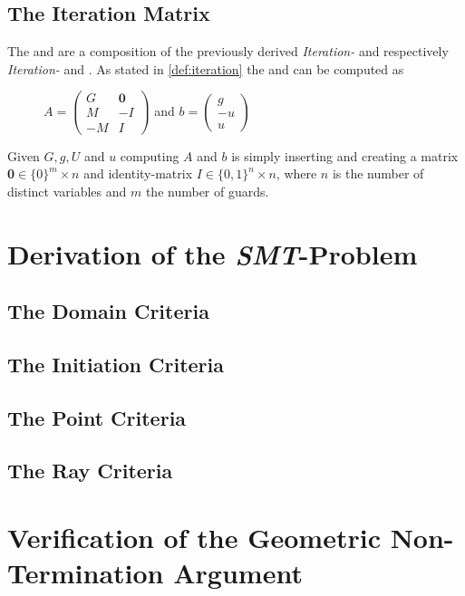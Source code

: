 \subsection{The Iteration Matrix}
The \iterationmatrix and \iterationconstants are a composition of the previously derived \textit{Iteration-} and \guardmatrix respectively \textit{Iteration- } and \guardconstants. \newline
As stated in \autoref{def:iteration} the \iterationmatrix and \iterationconstants can be computed as
\begin{figure}[H]
	\centering
	$A = \begin{pmatrix} G & \textbf{0} \\ M & -I \\ -M & I \end{pmatrix}$ and $b = \begin{pmatrix} g \\ -u \\ u \end{pmatrix}$ \cite{leike2014geometric}
\end{figure}
Given $G, g, U$ and $u$ computing $A$ and $b$ is simply inserting and creating a matrix \textbf{0}$ \in \{0\}^m\times n$ and identity-matrix $I \in \{0,1\}^n\times n$, where $n$ is the number of distinct variables and $m$ the number of guards.

\section{Derivation of the \emph{SMT}-Problem}

\subsection{The Domain Criteria}

\subsection{The Initiation Criteria}

\subsection{The Point Criteria}

\subsection{The Ray Criteria}

\section{Verification of the Geometric Non-Termination Argument}
	 
